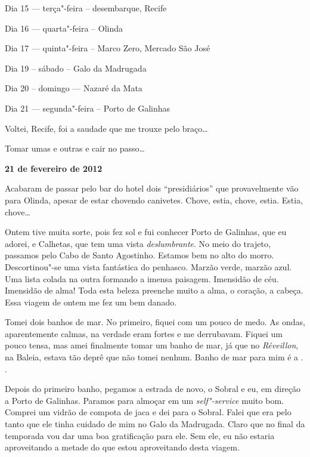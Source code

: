 Dia 15 --- terça"-feira -- desembarque, Recife

Dia 16 --- quarta"-feira -- Olinda

Dia 17 --- quinta"-feira -- Marco Zero, Mercado São José

Dia 19 -- sábado -- Galo da Madrugada

Dia 20 -- domingo --- Nazaré da Mata

Dia 21 --- segunda"-feira -- Porto de Galinhas

Voltei, Recife, foi a saudade que me trouxe pelo braço…

Tomar umas e outras e cair no passo…

\begin{center}\asterisc{}\end{center}


\begin{flushright}\textbf{21 de fevereiro de 2012}\end{flushright}


Acabaram de passar pelo bar do hotel dois ``presidiários'' que
provavelmente vão para Olinda, apesar de estar chovendo canivetes.
Chove, estia, chove, estia. Estia, chove…

Ontem tive muita sorte, pois fez sol e fui conhecer Porto de Galinhas,
que eu adorei, e Calhetas, que tem uma vista \emph{deslumbrante}. No
meio do trajeto, passamos pelo Cabo de Santo Agostinho. Estamos bem no
alto do morro. Descortinou"-se uma vista fantástica do penhasco. Marzão
verde, marzão azul. Uma lista colada na outra formando a imensa
paisagem. Imensidão de céu. Imensidão de alma! Toda esta beleza preenche
muito a alma, o coração, a cabeça. Essa viagem de ontem me fez um bem
danado.

Tomei dois banhos de mar. No primeiro, fiquei com um pouco de medo. As
ondas, aparentemente calmas, na verdade eram fortes e me derrubavam.
Fiquei um pouco tensa, mas amei finalmente tomar um banho de mar, já que
no \emph{Réveillon}, na Baleia, estava tão deprê que não tomei nenhum.
Banho de mar para mim é a . .

Depois do primeiro banho, pegamos a estrada de novo, o Sobral e eu, em
direção a Porto de Galinhas. Paramos para almoçar em um
\emph{self"-service} muito bom. Comprei um vidrão de compota de jaca e
dei para o Sobral. Falei que era pelo tanto que ele tinha cuidado de mim
no Galo da Madrugada. Claro que no final da temporada vou dar uma boa
gratificação para ele. Sem ele, eu não estaria aproveitando a metade do
que estou aproveitando desta viagem.

